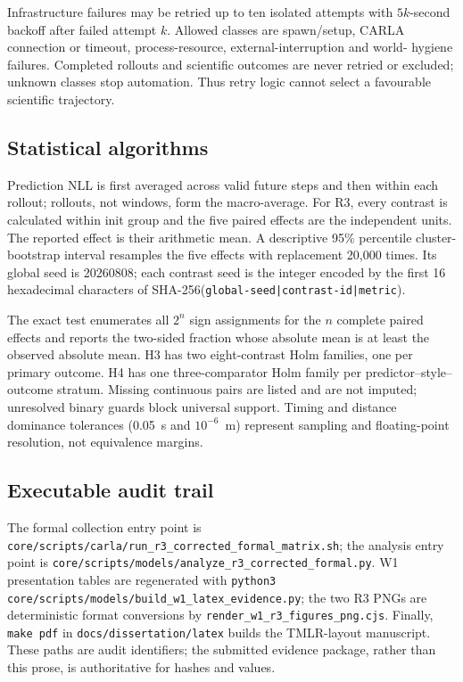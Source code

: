 Infrastructure failures may be retried up to ten isolated attempts with
$5k$-second backoff after failed attempt $k$. Allowed classes are spawn/setup,
CARLA connection or timeout, process-resource, external-interruption and world-
hygiene failures. Completed rollouts and scientific outcomes are never retried
or excluded; unknown classes stop automation. Thus retry logic cannot select a
favourable scientific trajectory.

\subsection{Statistical algorithms}

Prediction NLL is first averaged across valid future steps and then within each
rollout; rollouts, not windows, form the macro-average. For R3, every contrast
is calculated within init group and the five paired effects are the independent
units. The reported effect is their arithmetic mean. A descriptive 95\%
percentile cluster-bootstrap interval resamples the five effects with
replacement 20,000 times. Its global seed is 20260808; each contrast seed is
the integer encoded by the first 16 hexadecimal characters of
SHA-256(\texttt{global-seed|contrast-id|metric}).

The exact test enumerates all $2^n$ sign assignments for the $n$ complete
paired effects and reports the two-sided fraction whose absolute mean is at
least the observed absolute mean. H3 has two eight-contrast Holm families, one
per primary outcome. H4 has one three-comparator Holm family per
predictor--style--outcome stratum. Missing continuous pairs are listed and are
not imputed; unresolved binary guards block universal support. Timing and
distance dominance tolerances (0.05~s and $10^{-6}$~m) represent sampling and
floating-point resolution, not equivalence margins.

\subsection{Executable audit trail}

The formal collection entry point is
\texttt{core/scripts/carla/run\_r3\_corrected\_formal\_matrix.sh}; the analysis
entry point is
\texttt{core/scripts/models/analyze\_r3\_corrected\_formal.py}. W1 presentation
tables are regenerated with
\texttt{python3 core/scripts/models/build\_w1\_latex\_evidence.py}; the two R3
PNGs are deterministic format conversions by
\texttt{render\_w1\_r3\_figures\_png.cjs}. Finally, \texttt{make pdf} in
\texttt{docs/dissertation/latex} builds the TMLR-layout manuscript. These paths
are audit identifiers; the submitted evidence package, rather than this prose,
is authoritative for hashes and values.

